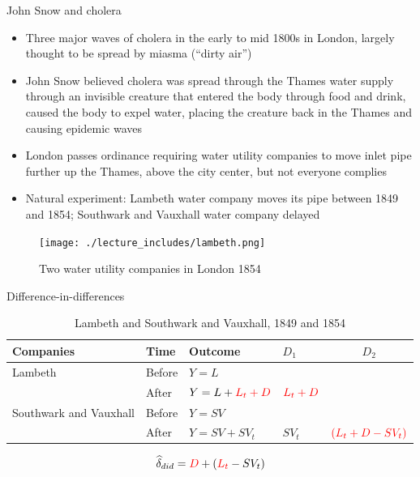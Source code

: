 \documentclass{beamer}
\begin{document}
\begin{frame}{John Snow and cholera}

\begin{itemize}
\item Three major waves of cholera in the early to mid 1800s in London, largely thought to be spread by miasma (``dirty air'')
\item John Snow believed cholera was spread through the Thames water supply through an invisible creature that entered the body through food and drink, caused the body to expel water, placing the creature back in the Thames and causing epidemic waves
\item London passes ordinance requiring water utility companies to move inlet pipe further up the Thames, above the city center, but not everyone complies
\item Natural experiment: Lambeth water company moves its pipe between 1849 and 1854; Southwark and Vauxhall water company delayed
\end{itemize}

\end{frame}


\begin{frame}

	\begin{figure}
	\caption{Two water utility companies in London 1854}
	\texttt{[image: ./lecture\_includes/lambeth.png]}
	\end{figure}


\end{frame}


\begin{frame}{Difference-in-differences}

\begin{table}\centering
\scriptsize
\caption{Lambeth and Southwark and Vauxhall, 1849 and 1854}
\begin{tabular}{lll|lc}
\toprule
\textbf{Companies} & \textbf{Time} & \textbf{Outcome} & $D_1$ & $D_2$ \\
\midrule
Lambeth & Before & $Y = L$ &  &  \\
        & After  & $Y = L + \textcolor{red}{L_t + D}$ & $\textcolor{red}{L_t + D}$ &  \\
\cmidrule{1-5}
Southwark and Vauxhall & Before & $Y = SV$ &  &  \\
                       & After  & $Y = SV + SV_t$ & $SV_t$ & $\textcolor{red}{(L_t + D - SV_t)}$ \\
\bottomrule
\end{tabular}
\end{table}

\begin{eqnarray*}
\widehat{\delta}_{did} = \textcolor{red}{D} + (\textcolor{red}{L_t} - SV_t)
\end{eqnarray*}

\end{frame}
\end{document}
